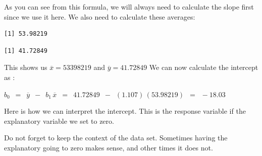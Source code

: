 \documentclass[
  letterpaper,
  DIV=11,
  numbers=noendperiod]{scrreprt}
\newenvironment{Shaded}{\begin{snugshade}}{\end{snugshade}}
\newcommand{\CommentTok}[1]{\textcolor[rgb]{0.37,0.37,0.37}{#1}}
\newcommand{\FunctionTok}[1]{\textcolor[rgb]{0.28,0.35,0.67}{#1}}
\newcommand{\NormalTok}[1]{\textcolor[rgb]{0.00,0.23,0.31}{#1}}
\newcommand{\OtherTok}[1]{\textcolor[rgb]{0.00,0.23,0.31}{#1}}
\newcommand{\SpecialCharTok}[1]{\textcolor[rgb]{0.37,0.37,0.37}{#1}}
\begin{document}
As you can see from this formula, we will always need to calculate the
slope first since we use it here. We also need to calculate these
averages:

\begin{Shaded}
\end{Shaded}

\begin{verbatim}
[1] 53.98219
\end{verbatim}

\begin{Shaded}
\end{Shaded}

\begin{verbatim}
[1] 41.72849
\end{verbatim}

This shows us \(\overline{x} = 53398219\) and
\(\overline{y} = 41.72849\) We can now calculate the intercept as :

\(\displaystyle{b_0\,\,\, = \,\,\, \overline{y} \,\,\, -\,\,\,b_1 \,
\overline{x}\,\,\, =\,\,\, 41.72849\,\,\, - \,\,\, (1.107)\,(53.98219)\,\,\, =
\,\,\,-18.03}\)

\begin{tcolorbox}[enhanced jigsaw, opacitybacktitle=0.6, coltitle=black, colframe=quarto-callout-tip-color-frame, colback=white, left=2mm, bottomtitle=1mm, breakable, leftrule=.75mm, arc=.35mm, toptitle=1mm, title=\textcolor{quarto-callout-tip-color}{\faLightbulb}\hspace{0.5em}{Interpreting the Intercept}, opacityback=0, rightrule=.15mm, bottomrule=.15mm, titlerule=0mm, toprule=.15mm, colbacktitle=quarto-callout-tip-color!10!white]

Here is how we can interpret the intercept. This is the response
variable if the explanatory variable we set to zero.

Do not forget to keep the context of the data set. Sometimes having the
explanatory going to zero makes sense, and other times it does not.

\end{tcolorbox}
\end{document}
